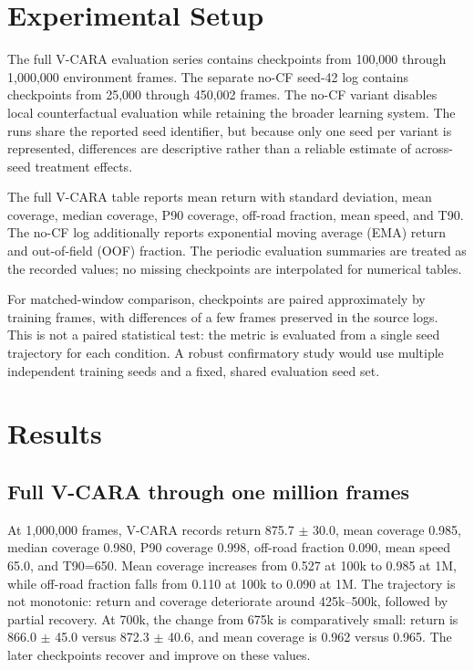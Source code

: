 \documentclass[11pt]{article}
\begin{document}
\section{Experimental Setup}\label{experimental-setup}

The full V-CARA evaluation series contains checkpoints from 100,000
through 1,000,000 environment frames. The separate no-CF seed-42 log
contains checkpoints from 25,000 through 450,002 frames. The no-CF
variant disables local counterfactual evaluation while retaining the
broader learning system. The runs share the reported seed identifier,
but because only one seed per variant is represented, differences are
descriptive rather than a reliable estimate of across-seed treatment
effects.

The full V-CARA table reports mean return with standard deviation, mean
coverage, median coverage, P90 coverage, off-road fraction, mean speed,
and T90. The no-CF log additionally reports exponential moving average
(EMA) return and out-of-field (OOF) fraction. The periodic
evaluation summaries are treated as the recorded values; no missing
checkpoints are interpolated for numerical tables.

For matched-window comparison, checkpoints are paired approximately by
training frames, with differences of a few frames preserved in the
source logs. This is not a paired statistical test: the metric is
evaluated from a single seed trajectory for each condition. A robust
confirmatory study would use multiple independent training seeds and a
fixed, shared evaluation seed set.

\section{Results}\label{results}

\subsection{Full V-CARA through one million
frames}\label{full-v-cara-through-one-million-frames}

At 1,000,000 frames, V-CARA records return 875.7 \(\pm\) 30.0, mean
coverage 0.985, median coverage 0.980, P90 coverage 0.998, off-road
fraction 0.090, mean speed 65.0, and T90=650. Mean coverage increases
from 0.527 at 100k to 0.985 at 1M, while off-road fraction falls from
0.110 at 100k to 0.090 at 1M. The trajectory is not monotonic: return and coverage deteriorate around
425k--500k, followed by partial recovery. At 700k, the change from 675k
is comparatively small: return is 866.0 \(\pm\) 45.0 versus 872.3
\(\pm\) 40.6, and mean coverage is 0.962 versus 0.965. The later
checkpoints recover and improve on these values.
\end{document}

